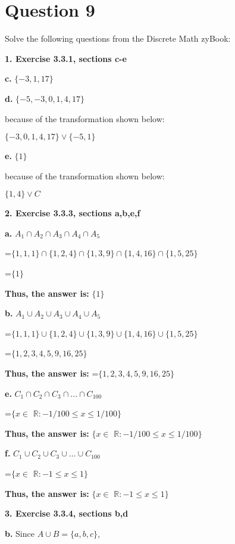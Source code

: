 \documentclass[11pt]{article}
\begin{document}
	\newpage
	\section*{Question 9}
	
	Solve the following questions from the Discrete Math zyBook:
	
	\textbf{1. Exercise 3.3.1, sections c-e}
	
	\textbf{c.}
	$\{ -3,1,17  \}$
	
	\textbf{d.}
	$\{-5,-3,0,1,4,17\}$
	
	because of the transformation shown below:
	
	$\{-3,0,1,4,17\}\vee \{-5,1\}$
	
	\textbf{e.}
	$\{1\}$
	
	because of the transformation shown below:
	
	$\{1,4\}\vee C$
	
	\vspace{10mm}
	\textbf{2. Exercise 3.3.3, sections a,b,e,f}
	
	\textbf{a.}
	$A_1\cap A_2\cap A_3\cap A_4\cap A_5$
	
	=$\{1,1,1\}\cap \{1,2,4\}\cap \{1,3,9\}\cap \{1,4,16\}\cap \{1,5,25\}$
	
	=$\{1\}$
	
	\textbf{Thus, the answer is:}
	$\{1\}$
	
	\textbf{b.}
	$A_1\cup A_2\cup A_3\cup A_4\cup A_5$
	
	=$\{1,1,1\}\cup \{1,2,4\}\cup \{1,3,9\}\cup \{1,4,16\}\cup \{1,5,25\}$
	
	=$\{1,2,3,4,5,9,16,25\}$
	
	\textbf{Thus, the answer is:}
	=$\{1,2,3,4,5,9,16,25\}$
	
	\textbf{e.}
	$C_1\cap C_2\cap C_3\cap ...\cap C_100$
	
	=$\{x\in$ $\mathbb{R}: -1/100\leq x\leq 1/100\}$
	
	\textbf{Thus, the answer is:}
	$\{x\in$ $\mathbb{R}: -1/100\leq x\leq 1/100\}$
	
	\textbf{f.}
	$C_1\cup C_2\cup C_3\cup ...\cup C_100$
	
	=$\{x\in$ $\mathbb{R}: -1\leq x\leq 1\}$
	
	\textbf{Thus, the answer is:}
	$\{x\in$ $\mathbb{R}: -1\leq x\leq 1\}$
	
	\vspace{10mm}
	\textbf{3. Exercise 3.3.4, sections b,d}
	
	\textbf{b.}
	Since $A\cup B=\{a,b,c\}$, 
	
\end{document}
